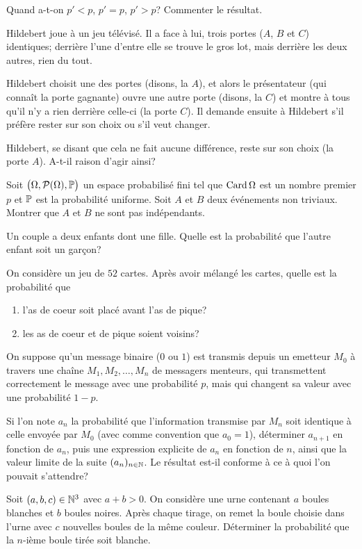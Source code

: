 \documentclass{yann}
\newcommand{\Part}{\mathcal{P}}
\newcommand{\Prob}{\bigl(\Omega, \Part(\Omega), \P\bigr)}
\begin{document}
Quand a-t-on $p' < p$, $p' = p$, $p' > p$? Commenter le résultat.


Hildebert joue à un jeu télévisé.
Il a face à lui, trois portes ($A$, $B$ et $C$) identiques;
derrière l'une d'entre elle se trouve le gros lot, mais derrière
les deux autres, rien du tout.

Hildebert choisit une des portes (disons, la $A$), et alors le
présentateur (qui connaît la porte gagnante) ouvre une autre porte
(disons, la $C$) et montre à tous qu'il n'y a rien derrière
celle-ci (la porte $C$).
Il demande ensuite à Hildebert s'il préfère rester sur son choix
ou s'il veut changer.

Hildebert, se disant que cela ne fait aucune différence,
reste sur son choix (la porte $A$).
A-t-il raison d'agir ainsi?

\Exercice

Soit $\Prob$ un espace probabilisé fini tel que $\Card{\Omega}$ est un nombre premier $p$ et $\P$ est la probabilité uniforme.
Soit $A$ et $B$ deux événements non triviaux.
Montrer que $A$ et $B$ ne sont pas indépendants.

\Exercice

Un couple a deux enfants dont une fille.
Quelle est la probabilité que l'autre enfant soit un garçon?

\Exercice

On considère un jeu de $52$ cartes.
Après avoir mélangé les cartes, quelle est la probabilité que
\begin{enumerate}
\item
l'as de coeur soit placé avant l'as de pique?
\item
les as de coeur et de pique soient voisins?
\end{enumerate}


On suppose qu'un message binaire ($0$ ou $1$) est transmis depuis un emetteur $M_0$ à travers une chaîne $M_1, M_2, \dots, M_n$ de messagers menteurs, qui transmettent correctement le message avec une probabilité $p$, mais qui changent sa valeur avec une probabilité $1-p$.

Si l'on note $a_n$ la probabilité que l'information transmise par $M_n$ soit identique à celle envoyée par $M_0$ (avec comme convention que $a_0=1$), déterminer $a_{n+1}$ en fonction de $a_n$, puis une expression explicite de $a_n$ en fonction de $n$, ainsi que la valeur limite de la suite $(a_n)_{n\in\N}$. Le résultat est-il conforme à ce à quoi l'on pouvait s'attendre?


Soit $(a,b,c) \in \N^3$ avec $a+b>0$.
On considère une urne contenant $a$ boules blanches et $b$ boules noires.
Après chaque tirage, on remet la boule choisie dans l'urne avec $c$ nouvelles boules de la même couleur.
Déterminer la probabilité que la $n$-ième boule tirée soit blanche.
\end{document}
